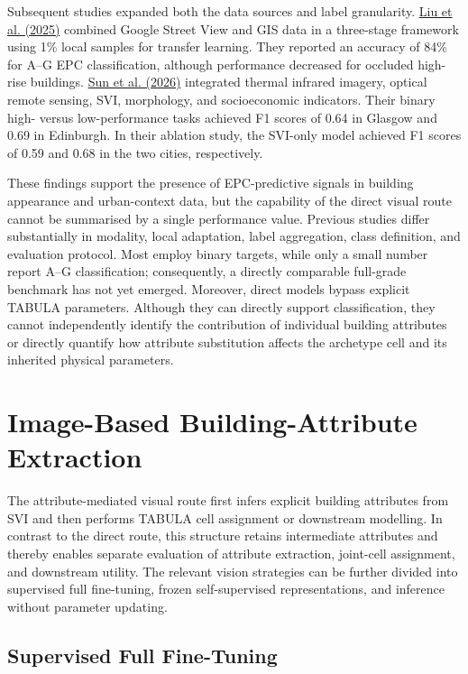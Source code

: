 Subsequent studies expanded both the data sources and label granularity. \hyperlink{ref:liu2025}{Liu et al. (2025)} combined Google Street View and GIS data in a three-stage framework using 1\% local samples for transfer learning. They reported an accuracy of 84\% for A--G EPC classification, although performance decreased for occluded high-rise buildings. \hyperlink{ref:sun2026}{Sun et al. (2026)} integrated thermal infrared imagery, optical remote sensing, SVI, morphology, and socioeconomic indicators. Their binary high- versus low-performance tasks achieved F1 scores of 0.64 in Glasgow and 0.69 in Edinburgh. In their ablation study, the SVI-only model achieved F1 scores of 0.59 and 0.68 in the two cities, respectively.


These findings support the presence of EPC-predictive signals in building appearance and urban-context data, but the capability of the direct visual route cannot be summarised by a single performance value. Previous studies differ substantially in modality, local adaptation, label aggregation, class definition, and evaluation protocol. Most employ binary targets, while only a small number report A--G classification; consequently, a directly comparable full-grade benchmark has not yet emerged. Moreover, direct models bypass explicit TABULA parameters. Although they can directly support classification, they cannot independently identify the contribution of individual building attributes or directly quantify how attribute substitution affects the archetype cell and its inherited physical parameters.


\section{Image-Based Building-Attribute Extraction}
\label{sec:2_5}


The attribute-mediated visual route first infers explicit building attributes from SVI and then performs TABULA cell assignment or downstream modelling. In contrast to the direct route, this structure retains intermediate attributes and thereby enables separate evaluation of attribute extraction, joint-cell assignment, and downstream utility. The relevant vision strategies can be further divided into supervised full fine-tuning, frozen self-supervised representations, and inference without parameter updating.


\subsection{Supervised Full Fine-Tuning}
\label{sec:2_5_1}


